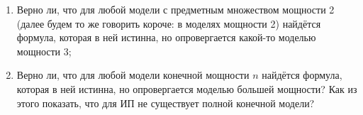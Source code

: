\documentclass[10pt,a4paper,oneside]{article}
\begin{document}
\begin{enumerate}
%
%
%
%
%
%

\item Верно ли, что для любой модели с предметным множеством мощности 2 (далее будем то же говорить короче: 
в моделях мощности 2) найдётся формула, которая в ней истинна, но опровергается какой-то моделью мощности 3;
\item Верно ли, что для любой модели конечной мощности $n$ найдётся формула, которая в ней истинна, но опровергается моделью большей
мощности? Как из этого показать, что для ИП не существует полной конечной модели?


\end{enumerate}
\end{document}
